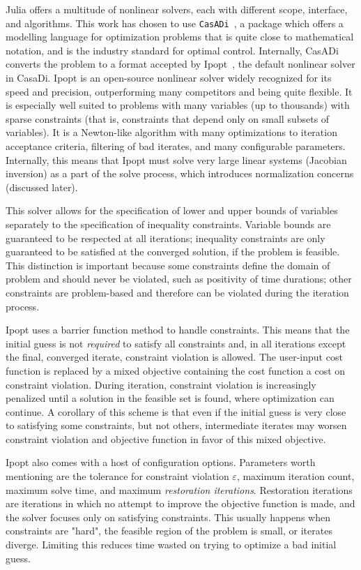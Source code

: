 Julia offers a multitude of nonlinear solvers, each with different scope, interface, and algorithms. This work has chosen to use \texttt{CasADi}~\cite{casadi}, a package which offers a modelling language for optimization problems that is quite close to mathematical notation, and is the industry standard for optimal control. Internally, CasADi converts the problem to a format accepted by Ipopt~\cite{ipopt}, the default nonlinear solver in CasaDi. Ipopt is an open-source nonlinear solver widely recognized for its speed and precision, outperforming many competitors and being quite flexible. It is especially well suited to problems with many variables (up to thousands) with sparse constraints (that is, constraints that depend only on small subsets of variables). It is a Newton-like algorithm with many optimizations to iteration acceptance criteria, filtering of bad iterates, and many configurable parameters. Internally, this means that Ipopt must solve very large linear systems (Jacobian inversion) as a part of the solve process, which introduces normalization concerns (discussed later).

This solver allows for the specification of lower and upper bounds of variables separately to the specification of inequality constraints. Variable bounds are guaranteed to be respected at all iterations; inequality constraints are only guaranteed to be satisfied at the converged solution, if the problem is feasible. This distinction is important because some constraints define the domain of problem and should never be violated, such as positivity of time durations; other constraints are problem-based and therefore can be violated during the iteration process.

Ipopt uses a barrier function method to handle constraints. This means that the initial guess is not \textit{required} to satisfy all constraints and, in all iterations except the final, converged iterate, constraint violation is allowed. The user-input cost function is replaced by a mixed objective containing the cost function a cost on constraint violation. During iteration, constraint violation is increasingly penalized until a solution in the feasible set is found, where optimization can continue. A corollary of this scheme is that even if the initial guess is very close to satisfying some constraints, but not others, intermediate iterates may worsen constraint violation and objective function in favor of this mixed objective.

Ipopt also comes with a host of configuration options. Parameters worth mentioning are the tolerance for constraint violation \(\varepsilon\), maximum iteration count, maximum solve time, and maximum \textit{restoration iterations}. Restoration iterations are iterations in which no attempt to improve the objective function is made, and the solver focuses only on satisfying constraints. This usually happens when constraints are "hard", the feasible region of the problem is small, or iterates diverge. Limiting this reduces time wasted on trying to optimize a bad initial guess.

